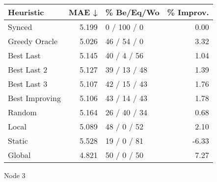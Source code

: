 \begin{tabular}{lrlr}
\toprule
\textbf{Heuristic} & \textbf{MAE ↓} & \textbf{\% Be/Eq/Wo} & \textbf{\% Improv.} \\
\midrule
            Synced &          5.199 &          0 / 100 / 0 &                0.00 \\
     Greedy Oracle &          5.026 &          46 / 54 / 0 &                3.32 \\
         Best Last &          5.145 &          40 / 4 / 56 &                1.04 \\
       Best Last 2 &          5.127 &         39 / 13 / 48 &                1.39 \\
       Best Last 3 &          5.107 &         42 / 15 / 43 &                1.76 \\
    Best Improving &          5.106 &         43 / 14 / 43 &                1.78 \\
            Random &          5.164 &         26 / 40 / 34 &                0.68 \\
             Local &          5.089 &          48 / 0 / 52 &                2.10 \\
            Static &          5.528 &          19 / 0 / 81 &               -6.33 \\
            Global &          4.821 &          50 / 0 / 50 &                7.27 \\
\bottomrule
\end{tabular}
\caption{Node 3}
\label{tab:ds_iid_lr05_le2_bs4_3}
